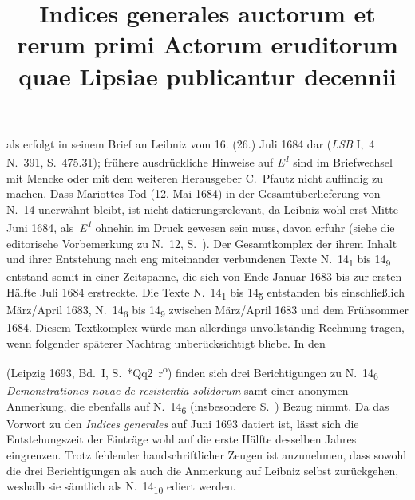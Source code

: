 als erfolgt in seinem Brief an Leibniz vom 16. (26.) Juli 1684 dar (\cite{01258}\textit{LSB} I,~4 N.~391, S.~475.31); 
frühere ausdrückliche Hinweise auf \textit{E\textsuperscript{1}} sind im Briefwechsel mit Mencke oder mit dem weiteren Herausgeber C.~Pfautz nicht auffindig zu machen.%
\protect{}%
\protect{}
Dass Mariottes\protect{} Tod (12. Mai 1684) in der Gesamtüberlieferung von N.~14 unerwähnt bleibt, ist nicht datierungsrelevant, da Leibniz wohl erst Mitte Juni 1684, als~\textit{E\textsuperscript{1}} %
ohnehin im Druck gewesen sein muss, davon erfuhr (siehe die editorische Vorbemerkung zu N.~12, S.~).%
\pend%
\pstart%
Der Gesamtkomplex der ihrem Inhalt und ihrer Entstehung nach eng miteinander verbundenen Texte N.~14\textsubscript{1} bis 14\textsubscript{9} entstand somit in einer Zeitspanne, die sich von Ende Januar 1683 bis zur ersten Hälfte Juli 1684 erstreckte.
Die Texte N.~14\textsubscript{1} bis 14\textsubscript{5} entstanden bis einschließlich März/April 1683, N.~14\textsubscript{6} bis 14\textsubscript{9} zwischen März/April 1683 und dem Frühsommer 1684.
Diesem Textkomplex würde man allerdings unvollständig Rechnung tragen, wenn folgender späterer Nachtrag unberücksichtigt bliebe.%
\pend%
\pstart%
In den \cite{01247}\title{Indices generales auctorum et rerum primi Actorum eruditorum quae Lipsiae publicantur decennii} (Leipzig 1693, Bd.~I, S.~*Qq2~r\textsuperscript{o}) finden sich drei Berichtigungen zu N.~14\textsubscript{6} \textit{Demonstrationes novae de resistentia solidorum} samt einer anonymen Anmerkung, die ebenfalls auf N.~14\textsubscript{6} (insbesondere %
S.~) Bezug nimmt.
Da das Vorwort zu den \textit{Indices generales} auf Juni 1693 datiert ist, lässt sich die Entstehungszeit der Einträge wohl auf die erste Hälfte desselben Jahres eingrenzen.
Trotz fehlender handschriftlicher Zeugen ist anzunehmen, dass sowohl die drei Berichtigungen als auch die Anmerkung auf Leibniz selbst zurückgehen, weshalb sie sämtlich als N.~14\textsubscript{10} ediert werden.
\pend%
\pstart%

